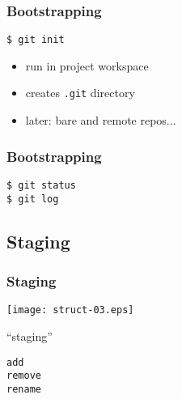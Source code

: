 \documentclass[english]{beamer}
\newcommand{\mysubsection}[2]{%
  \hypertarget{#2}{}%
  \subsection{#1}%
  \label{#2}%
}
\newcommand{\CMD}[1]{%
\texttt{\textcolor{code-blue}{#1}}%
}
\begin{document}
\begin{frame}
\frametitle{Bootstrapping}

\CMD{\$ git init} \\
\begin{itemize}
        \item run in project workspace
        \item creates \CMD{.git} directory \\
        \vspace{.1\textheight}
        \item later: bare and remote repos...
\end{itemize}
\end{frame}

\begin{frame}
\frametitle{Bootstrapping}

\CMD{\$ git status} \\
\vspace{.1\textheight}
\CMD{\$ git log} \\

\end{frame}

\mysubsection{Staging}{using:staging}
\begin{frame}
\frametitle{Staging}

\texttt{[image: struct-03.eps]}
\vspace{\baselineskip}
\begin{center}
        ``staging''

        \vspace{\baselineskip}
        \CMD{add} \\
        \CMD{remove} \\
        \CMD{rename}
\end{center}
\vspace{\textheight}
\end{frame}
\end{document}

